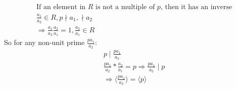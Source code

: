 \documentclass[11pt]{article}
\begin{document}
{\begin{align*}
     & \text{If an element in $R$ is not a multiple of $p$, then it has an inverse}                            \\
     & \frac{a_1}{a_2} \in R, p \nmid a_1, \nmid a_2                                                           \\
     & \Rightarrow \frac{a_1}{a_2}\frac{a_2}{a_1} = 1, \frac{a_2}{a_1} \in R
  \end{align*}
  So for any non-unit prime $\frac{pa_1}{a_2}$:
  \begin{align*}
     & p \mid \frac{pa_1}{a_2}                                                    \\
     & \frac{pa_1}{a_2} * \frac{a_2}{a_1} = p \Rightarrow \frac{pa_1}{a_2} \mid p \\
     & \Rightarrow \langle \frac{pa_1}{a_2} \rangle = \langle p \rangle
  \end{align*}
}
\end{document}

